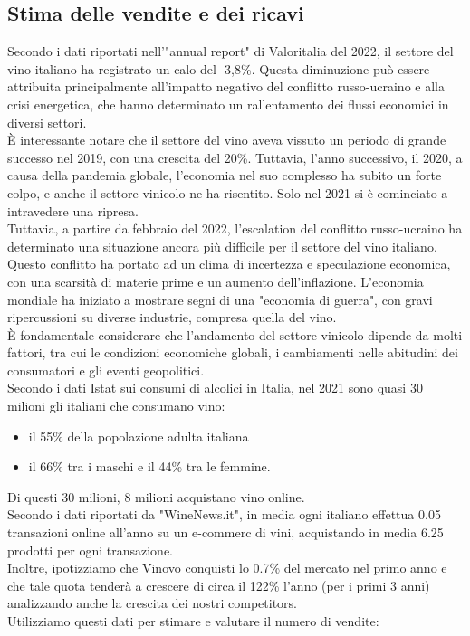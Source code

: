 \documentclass[12pt, a4paper]{article}
\newcommand{\meskip}{\medskip \\}
\newcommand{\bskip}{\bigskip \\}
\begin{document}
\subsection{Stima delle vendite e dei ricavi}
Secondo i dati riportati nell'"annual report" di Valoritalia del 2022, il settore del vino italiano ha registrato un calo del -3,8\%. Questa diminuzione può essere attribuita principalmente all'impatto negativo del conflitto russo-ucraino e alla crisi energetica, che hanno determinato un rallentamento dei flussi economici in diversi settori.\meskip
È interessante notare che il settore del vino aveva vissuto un periodo di grande successo nel 2019, con una crescita del 20\%. Tuttavia, l'anno successivo, il 2020, a causa della pandemia globale, l'economia nel suo complesso ha subito un forte colpo, e anche il settore vinicolo ne ha risentito. Solo nel 2021 si è cominciato a intravedere una ripresa.\meskip
Tuttavia, a partire da febbraio del 2022, l'escalation del conflitto russo-ucraino ha determinato una situazione ancora più difficile per il settore del vino italiano. Questo conflitto ha portato ad un clima di incertezza e speculazione economica, con una scarsità di materie prime e un aumento dell'inflazione. L'economia mondiale ha iniziato a mostrare segni di una "economia di guerra", con gravi ripercussioni su diverse industrie, compresa quella del vino.\meskip
È fondamentale considerare che l'andamento del settore vinicolo dipende da molti fattori, tra cui le condizioni economiche globali, i cambiamenti nelle abitudini dei consumatori e gli eventi geopolitici. \bskip
Secondo i dati Istat sui consumi di alcolici in Italia, nel 2021 sono quasi 30 milioni gli italiani che consumano vino:
\begin{itemize}[topsep=0pt]
    \item il 55\% della popolazione adulta italiana
    \item il 66\% tra i maschi e il 44\% tra le femmine.
\end{itemize}
Di questi 30 milioni, 8 milioni acquistano vino online.\meskip
Secondo i dati riportati da "WineNews.it", in media ogni italiano effettua 0.05 transazioni online all'anno su un e-commerc di vini, acquistando in media 6.25 prodotti per ogni transazione.\meskip
Inoltre, ipotizziamo che Vinovo conquisti lo 0.7\% del mercato nel primo anno e che tale quota tenderà a crescere di circa il 122\% l'anno (per i primi 3 anni) analizzando anche la crescita dei nostri competitors.\\
Utilizziamo questi dati per stimare e valutare il numero di vendite:
\end{document}
